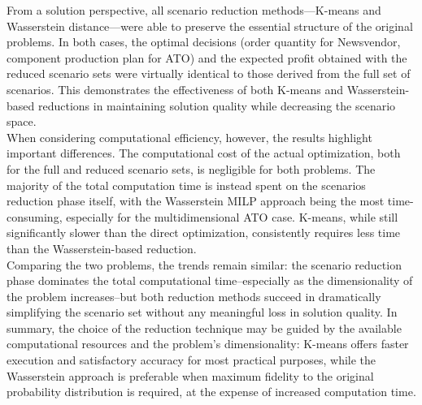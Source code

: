 \documentclass[a4paper,12pt]{article}
\begin{document}
	From a solution perspective, all scenario reduction methods—K-means and Wasserstein distance—were able to preserve the essential structure of the original problems. In both cases, the optimal decisions (order quantity for Newsvendor, component production plan for ATO) and the expected profit obtained with the reduced scenario sets were virtually identical to those derived from the full set of scenarios. This demonstrates the effectiveness of both K-means and Wasserstein-based reductions in maintaining solution quality while decreasing the scenario space.\\
	
	When considering computational efficiency, however, the results highlight important differences. The computational cost of the actual optimization, both for the full and reduced scenario sets, is negligible for both problems. The majority of the total computation time is instead spent on the scenarios reduction phase itself, with the Wasserstein MILP approach being the most time-consuming, especially for the multidimensional ATO case. K-means, while still significantly slower than the direct optimization, consistently requires less time than the Wasserstein-based reduction.\\
	
	\noindent Comparing the two problems, the trends remain similar: the scenario reduction phase dominates the total computational time--especially as the dimensionality of the problem increases--but both reduction methods succeed in dramatically simplifying the scenario set without any meaningful loss in solution quality. In summary, the choice of the reduction technique may be guided by the available computational resources and the problem's dimensionality: K-means offers faster execution and satisfactory accuracy for most practical purposes, while the Wasserstein approach is preferable when maximum fidelity to the original probability distribution is required, at the expense of increased computation time.
	
	
		
	
\end{document}
